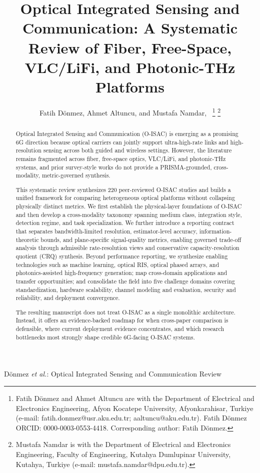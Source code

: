 \documentclass[letterpaper,journal]{IEEEtran}
\begin{document}
\title{Optical Integrated Sensing and Communication: A Systematic Review of Fiber, Free-Space, VLC/LiFi, and Photonic-THz Platforms}

\author{Fatih D\"onmez, Ahmet Altuncu, and Mustafa Namdar,~%
    \thanks{Fatih D\"onmez and Ahmet Altuncu are with the Department of Electrical and Electronics Engineering, Afyon Kocatepe University, Afyonkarahisar, Turkiye (e-mail: fatih.donmez@usr.aku.edu.tr; aaltuncu@aku.edu.tr). Fatih D\"onmez ORCID: 0000-0003-0553-4418. Corresponding author: Fatih D\"onmez.}%
    \thanks{Mustafa Namdar is with the Department of Electrical and Electronics Engineering, Faculty of Engineering, Kutahya Dumlupinar University, Kutahya, Turkiye (e-mail: mustafa.namdar@dpu.edu.tr).}}

%
{D\"onmez \MakeLowercase{\textit{et al.}}: Optical Integrated Sensing and Communication Review}

\maketitle

\begin{abstract}
    Optical Integrated Sensing and Communication (O-ISAC) is emerging as a promising 6G direction because optical carriers can jointly support ultra-high-rate links and high-resolution sensing across both guided and wireless settings. However, the literature remains fragmented across fiber, free-space optics, VLC/LiFi, and photonic-THz systems, and prior survey-style works do not provide a PRISMA-grounded, cross-modality, metric-governed synthesis.

    This systematic review synthesizes 220 peer-reviewed O-ISAC studies and builds a unified framework for comparing heterogeneous optical platforms without collapsing physically distinct metrics. We first establish the physical-layer foundations of O-ISAC and then develop a cross-modality taxonomy spanning medium class, integration style, detection regime, and task specialization. We further introduce a reporting contract that separates bandwidth-limited resolution, estimator-level accuracy, information-theoretic bounds, and plane-specific signal-quality metrics, enabling governed trade-off analysis through admissible rate-resolution views and conservative capacity-resolution quotient (CRQ) synthesis. Beyond performance reporting, we synthesize enabling technologies such as machine learning, optical RIS, optical phased arrays, and photonics-assisted high-frequency generation; map cross-domain applications and transfer opportunities; and consolidate the field into five challenge domains covering standardization, hardware scalability, channel modeling and evaluation, security and reliability, and deployment convergence.

    The resulting manuscript does not treat O-ISAC as a single monolithic architecture. Instead, it offers an evidence-backed roadmap for when cross-paper comparison is defensible, where current deployment evidence concentrates, and which research bottlenecks most strongly shape credible 6G-facing O-ISAC systems.
\end{abstract}
\end{document}
